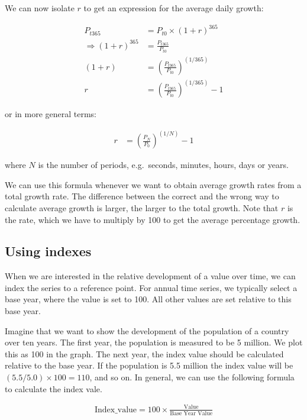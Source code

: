 \documentclass[]{book}
\begin{document}
We can now isolate \(r\) to get an expression for the average daily growth:

\begin{align}
   P_{t365}&=P_{t0}\times(1+r)^{365}\nonumber\\
   \Rightarrow
   (1+r)^365&=\frac{P_{t365}}{P_{t0}}\nonumber\\
   (1+r)&=\left(\frac{P_{t365}}{P_{t0}}\right)^{(1/365)}\nonumber\\
   r&=\left(\frac{P_{t365}}{P_{t0}}\right)^{(1/365)}-1
\end{align}

or in more general terms:

\begin{align}
   r&=\left(\frac{P_{N}}{P_{0}}\right)^{(1/N)}-1
\end{align}

where \(N\) is the number of periods, e.g.~seconds, minutes, hours, days or years.

We can use this formula whenever we want to obtain average growth rates from a total growth rate. The difference between the correct and the wrong way to calculate average growth is larger, the larger to the total growth. Note that \(r\) is the rate, which we have to multiply by 100 to get the average percentage growth.

\hypertarget{using-indexes}{%
\subsection{Using indexes}\label{using-indexes}}

When we are interested in the relative development of a value over time, we can index the series to a reference point. For annual time series, we typically select a base year, where the value is set to 100. All other values are set relative to this base year.

Imagine that we want to show the development of the population of a country over ten years. The first year, the population is measured to be 5 million. We plot this as 100 in the graph. The next year, the index value should be calculated relative to the base year. If the population is 5.5 million the index value will be \((5.5/5.0)\times 100=110\), and so on. In general, we can use the following formula to calculate the index vale.

\begin{align}
  \text{Index\_value}=100\times \frac{\text{Value}}{\text{Base Year Value}}
\end{align}
\end{document}
